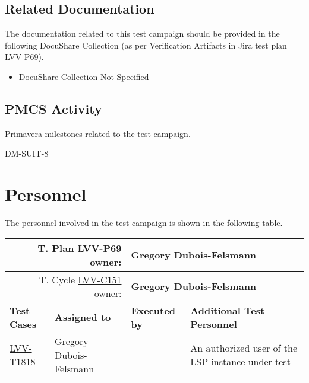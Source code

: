 \documentclass[DM,lsstdraft,STR,toc]{lsstdoc}
\begin{document}
\subsection{Related Documentation}

The documentation related to this test campaign should be provided in the following DocuShare Collection
(as per Verification Artifacts in Jira test plan LVV-P69).

\begin{itemize}
\item DocuShare Collection Not Specified
\end{itemize}



\subsection{PMCS Activity}

Primavera milestones related to the test campaign.

DM-SUIT-8


\newpage
\section{Personnel}
\label{sect:personnel}

The personnel involved in the test campaign is shown in the following table.

{\small
\begin{longtable}{p{3cm}p{3cm}p{3cm}p{6cm}}
\hline
\multicolumn{2}{r}{T. Plan \href{https://jira.lsstcorp.org/secure/Tests.jspa\#/testPlan/LVV-P69}{LVV-P69} owner:} &
\multicolumn{2}{l}{\textbf{ Gregory Dubois-Felsmann } }\\\hline
\multicolumn{2}{r}{T. Cycle \href{https://jira.lsstcorp.org/secure/Tests.jspa\#/testCycle/LVV-C151}{LVV-C151} owner:} &
\multicolumn{2}{l}{\textbf{
Gregory Dubois-Felsmann}
} \\\hline
\textbf{Test Cases} & \textbf{Assigned to} & \textbf{Executed by} & \textbf{Additional Test Personnel} \\ \hline
\href{https://jira.lsstcorp.org/secure/Tests.jspa#/testCase/LVV-T1818}{LVV-T1818}
& {\small Gregory Dubois-Felsmann } & {\small  } &
\begin{minipage}[]{6cm}
\smallskip
{\small An authorized user of the LSP instance under test }
\medskip
\end{minipage}
\\ \hline
\end{longtable}
}
\end{document}
